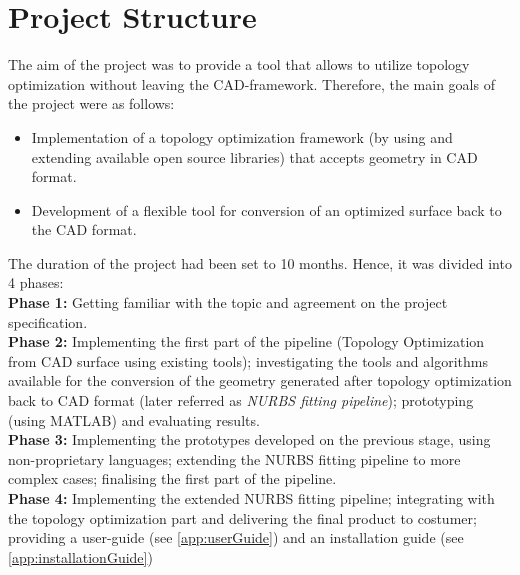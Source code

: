 \section{Project Structure}
The aim of the project was to provide a tool that allows to utilize topology optimization without leaving the CAD-framework. Therefore, the main goals of the project were as follows:
\begin{itemize}
\item Implementation of a topology optimization framework (by using and extending available open source libraries) that accepts geometry in CAD format.
\item Development of a flexible tool for conversion of an optimized surface back to the CAD format.
\end{itemize}

The duration of the project had been set to 10 months. Hence, it was divided into 4 phases:\\

\textbf{Phase 1:} Getting familiar with the topic and agreement on the project specification.\\

\textbf{Phase 2:} Implementing the first part of the pipeline (Topology Optimization from CAD surface using existing tools); investigating the tools and algorithms available for the conversion of the geometry generated after topology optimization back to CAD format (later referred as \emph{NURBS fitting pipeline}); prototyping (using MATLAB) and evaluating results.\\

\textbf{Phase 3:} Implementing the prototypes developed on the previous stage, using non-proprietary languages; extending the NURBS fitting pipeline to more complex cases; finalising the first part of the pipeline.\\

\textbf{Phase 4:} Implementing the extended NURBS fitting pipeline; integrating with the topology optimization part and delivering the final product to costumer; providing a user-guide (see \autoref{app:userGuide}) and an installation guide (see \autoref{app:installationGuide})
